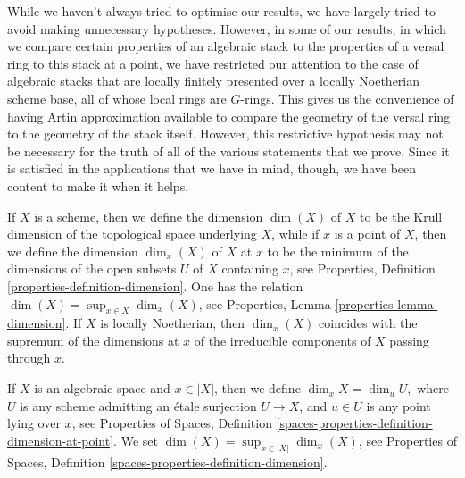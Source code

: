 \documentclass{stacks-project}
\theoremstyle{plain}
\theoremstyle{definition}
\theoremstyle{remark}
\numberwithin{equation}{subsection}
\begin{document}
\medskip\noindent
While we haven't always tried to optimise our results, we have
largely tried to avoid making unnecessary hypotheses.  However, in some
of our results, in which we compare certain properties of an algebraic
stack to the properties of a versal ring to this
stack at a point, we have restricted our attention
to the case of algebraic stacks that are locally finitely presented
over a locally Noetherian scheme base, all of whose local rings are
$G$-rings. This gives us the convenience of having Artin approximation
available to compare the geometry of the versal ring to the geometry
of the stack itself.  However, this restrictive hypothesis
may not be necessary for the truth
of all of the various statements that we prove.
Since it is satisfied in the applications that we have in mind,
though, we have been content to make it when it helps.

\medskip\noindent
If $X$ is a scheme, then we define the dimension $\dim(X)$ of $X$
to be the Krull dimension of the
topological space underlying $X$,
while if $x$ is a point of $X$,
then we define the dimension $\dim_x (X)$ of $X$ at $x$ to be the
minimum of the dimensions of the open subsets $U$ of $X$ containing
$x$, see
Properties, Definition \ref{properties-definition-dimension}.
One has the relation $\dim(X) = \sup_{x \in X} \dim_x(X)$, see
Properties, Lemma \ref{properties-lemma-dimension}.
If $X$ is locally Noetherian, then $\dim_x(X)$ coincides with the supremum
of the dimensions at $x$
of the irreducible components of $X$ passing through $x$.

\medskip\noindent
If $X$ is an algebraic space and $x \in |X|$,
then we define $\dim_x X = \dim_u U,$ where $U$ is any scheme
admitting an \'etale surjection $U \to X$,
and $u\in U$ is any point lying over $x$, see
Properties of Spaces, Definition
\ref{spaces-properties-definition-dimension-at-point}.
We set $\dim(X) = \sup_{x \in |X|} \dim_x(X)$, see
Properties of Spaces, Definition \ref{spaces-properties-definition-dimension}.
\end{document}
